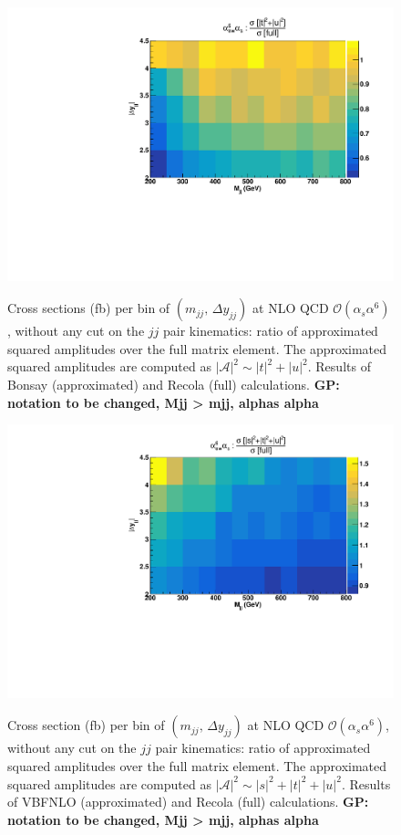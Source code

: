 \begin{figure}[h]
\centering
{\includegraphics[scale=0.39]{figures/scanfigures/a6as_vbfnloVSrecola_tu.pdf}}
\caption{Cross sections (fb) per bin of $(m_{jj},\,\Delta y_{jj})$ at NLO QCD $\mathcal{O}(\alpha_s\alpha^6)$, without any cut on the $jj$ pair kinematics: ratio of approximated squared amplitudes over the full matrix element. The approximated squared amplitudes are computed as $|\mathcal{A}|^2 \sim |t|^2 + |u|^2$. Results of {\sc Bonsay} (approximated) and {\sc Recola} (full) calculations. {\bf GP: notation to be changed, Mjj > mjj, alphas alpha} }\label{fig:ratio2d_NLO}
\end{figure}
\begin{figure}[hbt]
\centering
{\includegraphics[scale=0.39]{figures/scanfigures/a6as_vbfnloVSrecola_stu.pdf}}
\caption{Cross section (fb) per bin of $(m_{jj},\,\Delta y_{jj})$ at NLO QCD $\mathcal{O}(\alpha_s\alpha^6)$, without any cut on the $jj$ pair kinematics:  ratio of approximated squared amplitudes over the full matrix element. The approximated squared amplitudes are computed as $|\mathcal{A}|^2 \sim |s|^2 + |t|^2 + |u|^2$. Results of {\sc VBFNLO} (approximated) and {\sc Recola} (full) calculations. {\bf GP: notation to be changed, Mjj > mjj, alphas alpha}}\label{fig:mjjdyjj_2d_NLO}
\end{figure}
